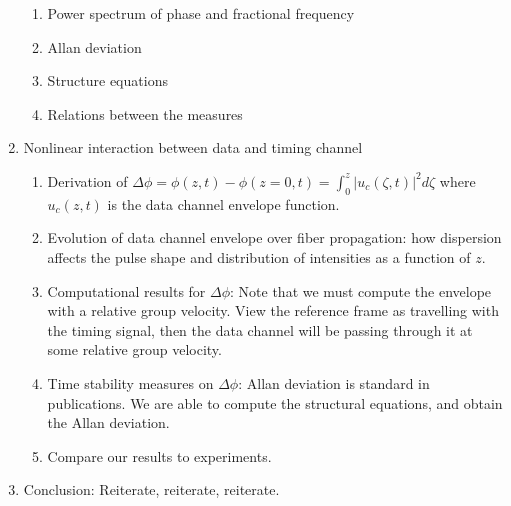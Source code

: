 \documentclass[20pt]{article}
\begin{document}
\begin{enumerate}[I]
\begin{enumerate}[i]
\item Power spectrum of phase and fractional frequency

\item Allan deviation

\item Structure equations

\item Relations between the measures

\end{enumerate}

\item Nonlinear interaction between data and timing channel
\begin{enumerate}[i]

	\item Derivation of $\Delta\phi = \phi(z,t) - \phi(z=0,t) = \int_0^z |u_c(\zeta, t)|^2 d\zeta$ where $u_c(z,t)$ is the data channel envelope function.

	\item Evolution of data channel envelope over fiber propagation: how dispersion affects the pulse shape and distribution of intensities as a function of $z$.
	
	\item Computational results for $\Delta\phi$: Note that we must compute the envelope with a relative group velocity.  View the reference frame as travelling with the timing signal, then the data channel will be passing through it at some relative group velocity.
	
	\item Time stability measures on $\Delta\phi$: Allan deviation is standard in publications.  We are able to compute the structural equations, and obtain the Allan deviation.

	\item Compare our results to experiments.

\end{enumerate}

\item Conclusion:  Reiterate, reiterate, reiterate.

\end{enumerate}
\end{document}
